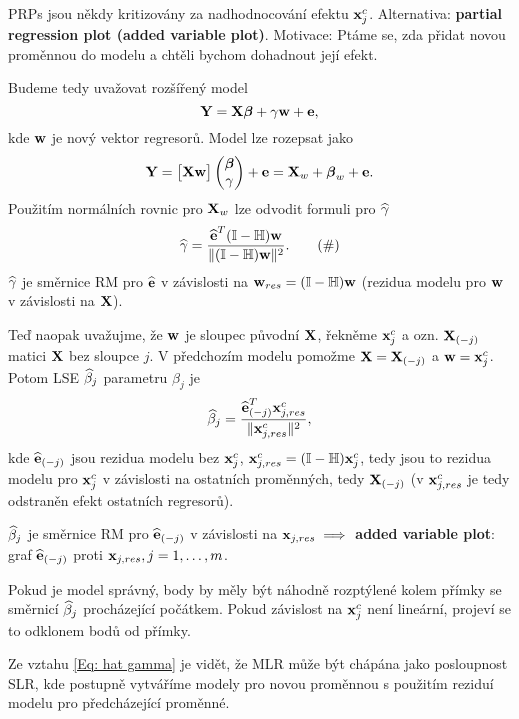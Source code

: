 \begin{remark}
	PRPs jsou někdy kritizovány za nadhodnocování efektu $\textbf{x}_j^c$. \linebreak
	Alternativa: \textbf{partial regression plot (added variable plot)}. \linebreak
	Motivace: Ptáme se, zda přidat novou proměnnou do modelu a chtěli bychom dohadnout její efekt.
	
	Budeme tedy uvažovat rozšířený model
	$$
	\textbf{Y} = \textbf{X} \boldsymbol{\beta} + \gamma \mathbf{w} + \textbf{e},
	$$
	kde $\mathbf{w}$ je nový vektor regresorů. Model lze rozepsat jako
	$$
	\textbf{Y} =  \begin{bmatrix}
	\textbf{X} \mathbf{w}
	\end{bmatrix} \begin{pmatrix}
	\boldsymbol{\beta} \\ \gamma
	\end{pmatrix} + \textbf{e} = \textbf{X}_{w} + \boldsymbol{\beta}_{w} + \textbf{e}.
	$$
	Použitím normálních rovnic pro $\textbf{X}_{w}$ lze odvodit formuli pro $\widehat{\gamma}$
	\begin{equation*}
		\widehat{\gamma} = \frac{\widehat{\textbf{e}}^T (\mathbb{I} - \mathbb{H}) \mathbf{w}}{\| (\mathbb{I} - \mathbb{H})\mathbf{w} \|^2}.
		\tag{\#}
		\label{Eq: hat gamma}
	\end{equation*}
	$\widehat{\gamma}$ je směrnice RM pro $\widehat{\textbf{e}}$ v závislosti na $\mathbf{w}_{res} = (\mathbb{I} - \mathbb{H})\mathbf{w}$ (rezidua modelu pro $\mathbf{w}$ v závislosti na $\textbf{X}$).
	
	Teď naopak uvažujme, že $\mathbf{w}$ je sloupec původní $\textbf{X}$, řekněme $\textbf{x}_j^c$ a ozn. $\textbf{X}_{(-j)}$ matici $\textbf{X}$ bez sloupce $j$. V předchozím modelu pomožme $\textbf{X} = \textbf{X}_{(-j)}$ a $\mathbf{w} = \textbf{x}_j^c$. Potom  LSE $\widehat{\beta}_j$ parametru $\beta_j$ je
	$$
	\widehat{\beta}_j = \frac{\widehat{\textbf{e}}_{(-j)}^T \textbf{x}_{j, res}^c}{\| \textbf{x}_{j,res}^c \|^2},
	$$
	kde $\widehat{\textbf{e}}_{(-j)}$ jsou rezidua modelu bez $\textbf{x}_j^c$, $\textbf{x}_{j,res}^c = (\mathbb{I} - \mathbb{H}) \textbf{x}_j^c$, tedy jsou to rezidua modelu pro $\textbf{x}_j^c$  v závislosti na ostatních proměnných, tedy $\textbf{X}_{(-j)}$ (v $\textbf{x}_{j,res}^c$ je tedy odstraněn efekt ostatních regresorů).
	
	$\widehat{\beta}_j$ je směrnice RM pro $\widehat{\textbf{e}}_{(-j)}$ v závislosti na $\textbf{x}_{j, res} \implies$ \linebreak
	\textbf{added variable plot}: graf $\widehat{\textbf{e}}_{(-j)}$ proti $\textbf{x}_{j, res}, j = 1, \dots, m$.
	
	Pokud je model správný, body by měly být náhodně rozptýlené kolem přímky se směrnicí $\widehat{\beta}_j$ procházející počátkem. Pokud závislost na $\textbf{x}_j^c$ není lineární, projeví se to odklonem bodů od přímky.
\end{remark}

\begin{remark}
Ze vztahu \eqref{Eq: hat gamma} je vidět, že MLR může být chápána jako posloupnost SLR, kde postupně vytváříme modely pro novou proměnnou s použitím reziduí modelu pro předcházející proměnné.
\end{remark}

